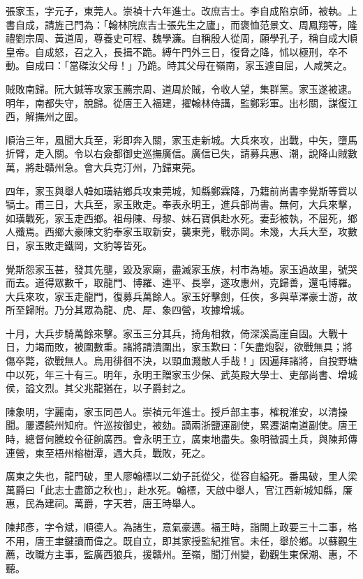\begin{pinyinscope}
張家玉，字元子，東莞人。崇禎十六年進士。改庶吉士。李自成陷京師，被執。上書自成，請旌己門為：「翰林院庶吉士張先生之廬」，而褒恤范景文、周鳳翔等，隆禮劉宗周、黃道周，尊養史可程、魏學濂。自稱殷人從周，願學孔子，稱自成大順皇帝。自成怒，召之入，長揖不跪。縛午門外三日，復脅之降，怵以極刑，卒不動。自成曰：「當磔汝父母！」乃跪。時其父母在嶺南，家玉遽自屈，人咸笑之。

賊敗南歸。阮大鋮等攻家玉薦宗周、道周於賊，令收人望，集群黨。家玉遂被逮。明年，南都失守，脫歸。從唐王入福建，擢翰林侍講，監鄭彩軍。出杉關，謀復江西，解撫州之圍。

順治三年，風聞大兵至，彩即奔入關，家玉走新城。大兵來攻，出戰，中矢，墮馬折臂，走入關。令以右僉都御史巡撫廣信。廣信已失，請募兵惠、潮，說降山賊數萬，將赴贛州急。會大兵克汀州，乃歸東莞。

四年，家玉與舉人韓如璜結鄉兵攻東莞城，知縣鄭霖降，乃籍前尚書李覺斯等貲以犒士。甫三日，大兵至，家玉敗走。奉表永明王，進兵部尚書。無何，大兵來擊，如璜戰死，家玉走西鄉。祖母陳、母黎、妹石寶俱赴水死。妻彭被執，不屈死，鄉人殲焉。西鄉大豪陳文豹奉家玉取新安，襲東莞，戰赤岡。未幾，大兵大至，攻數日，家玉敗走鐵岡，文豹等皆死。

覺斯怨家玉甚，發其先壟，毀及家廟，盡滅家玉族，村市為墟。家玉過故里，號哭而去。道得眾數千，取龍門、博羅、連平、長寧，遂攻惠州，克歸善，還屯博羅。大兵來攻，家玉走龍門，復募兵萬餘人。家玉好擊劍，任俠，多與草澤豪士游，故所至歸附。乃分其眾為龍、虎、犀、象四營，攻據增城。

十月，大兵步騎萬餘來擊。家玉三分其兵，掎角相救，倚深溪高崖自固。大戰十日，力竭而敗，被圍數重。諸將請潰圍出，家玉歎曰：「矢盡炮裂，欲戰無具；將傷卒斃，欲戰無人。烏用徘徊不決，以頸血濺敵人手哉！」因遍拜諸將，自投野塘中以死，年三十有三。明年，永明王贈家玉少保、武英殿大學士、吏部尚書、增城侯，謚文烈。其父兆龍猶在，以子爵封之。

陳象明，字麗南，家玉同邑人。崇禎元年進士。授戶部主事，榷稅淮安，以清操聞。屢遷饒州知府。忤巡按御史，被劾。謫兩浙鹽運副使，累遷湖南道副使。唐王時，總督何騰蛟令征餉廣西。會永明王立，廣東地盡失。象明徵調土兵，與陳邦傳連營，東至梧州榕樹潭，遇大兵，戰敗，死之。

廣東之失也，龍門破，里人廖翰標以二幼子託從父，從容自縊死。番禺破，里人梁萬爵曰「此志士盡節之秋也」，赴水死。翰標，天啟中舉人，官江西新城知縣，廉惠，民為建祠。萬爵，字天若，唐王時舉人。

陳邦彥，字令斌，順德人。為諸生，意氣豪邁。福王時，詣闕上政要三十二事，格不用，唐王聿鍵讀而偉之。既自立，即其家授監紀推官。未任，舉於鄉。以蘇觀生薦，改職方主事，監廣西狼兵，援贛州。至嶺，聞汀州變，勸觀生東保潮、惠，不聽。


\end{pinyinscope}
